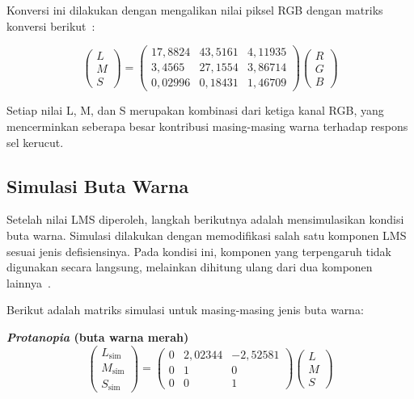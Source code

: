 Konversi ini dilakukan dengan mengalikan nilai piksel RGB dengan matriks konversi berikut~\parencite{Vienot1999DigitalVC, muhammad2020analysis, tasnim2017}:

\begin{equation}
  \begin{pmatrix} L \\ M \\ S \end{pmatrix}
  =
  \begin{pmatrix}
    17{,}8824 & 43{,}5161 & 4{,}11935 \\
    3{,}4565  & 27{,}1554 & 3{,}86714 \\
    0{,}02996 & 0{,}18431 & 1{,}46709
  \end{pmatrix}
  \begin{pmatrix} R \\ G \\ B \end{pmatrix}
  \label{eq:rgb-to-lms}
\end{equation}

Setiap nilai L, M, dan S merupakan kombinasi dari ketiga kanal RGB, yang mencerminkan seberapa besar kontribusi masing-masing warna terhadap respons sel kerucut.

\subsection{Simulasi Buta Warna}

Setelah nilai LMS diperoleh, langkah berikutnya adalah mensimulasikan kondisi buta warna.
Simulasi dilakukan dengan memodifikasi salah satu komponen LMS sesuai jenis defisiensinya.
Pada kondisi ini, komponen yang terpengaruh tidak digunakan secara langsung, melainkan dihitung ulang dari dua komponen lainnya~\parencite{Vienot1999DigitalVC, muhammad2020analysis, tasnim2017}.

Berikut adalah matriks simulasi untuk masing-masing jenis buta warna:

\noindent\textbf{\textit{Protanopia} (buta warna merah)}
\begin{equation}
  \begin{pmatrix} L_{\text{sim}} \\ M_{\text{sim}} \\ S_{\text{sim}} \end{pmatrix}
  =
  \begin{pmatrix}
    0 & 2{,}02344 & -2{,}52581 \\
    0 & 1         & 0 \\
    0 & 0         & 1
  \end{pmatrix}
  \begin{pmatrix} L \\ M \\ S \end{pmatrix}
  \label{eq:sim-protanopia}
\end{equation}

